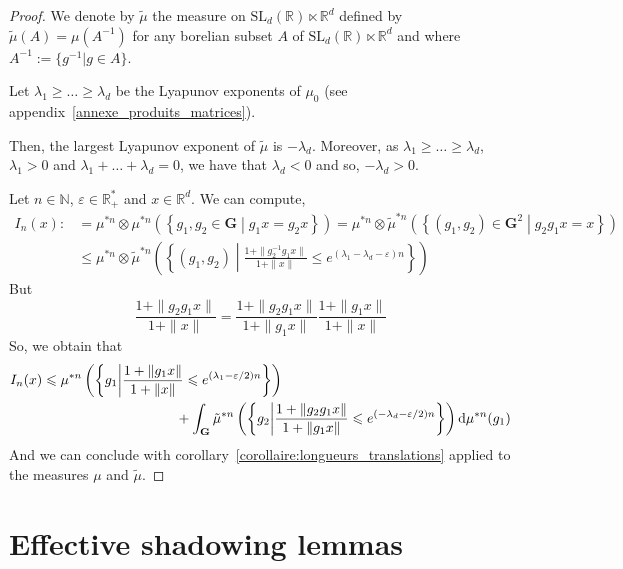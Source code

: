 \documentclass[11pt]{amsart}
\theoremstyle{definition}
\theoremstyle{remark}
\numberwithin{equation}{section}
\begin{document}
\begin{proof}
We denote by $\tilde \mu$ the measure on $\mathrm{SL}_d({\mathbb R})\ltimes {\mathbb R}^d$ defined by $\tilde\mu(A) = \mu(A^{-1})$ for any borelian subset $A$ of $\mathrm{SL}_d({\mathbb R})\ltimes {\mathbb R}^d$ and where $A^{-1} := \{g^{-1 } | g\in A\}$.

Let $\lambda_1 \geqslant \dots \geqslant \lambda_d$ be the Lyapunov exponents of $\mu_0$ (see appendix~\ref{annexe_produits_matrices}).

Then, the largest Lyapunov exponent of $\tilde \mu$ is $-\lambda_d$. Moreover, as $\lambda_1 \geqslant \dots \geqslant \lambda_d$, $\lambda_1>0$ and $\lambda_1 + \dots + \lambda_d = 0$, we have that $\lambda_d <0$ and so, $-\lambda_d>0$.

Let $n\in {\mathbb N}$, $\varepsilon\in {\mathbb R}_+^\ast$ and $x\in {\mathbb R}^d$. We can compute,
\begin{align*}
I_n(x):&=\mu^{\ast n} \otimes \mu^{\ast n} \left(\left\{g_1,g_2 \in {\mathbf G} \middle| g_1 x=g_2x \right\}\right) = \mu^{\ast n} \otimes \tilde\mu^{\ast n} \left(\left\{(g_1,g_2) \in {\mathbf G}^2 \middle| g_2g_1 x=x \right\}\right) \\
&\leqslant \mu^{\ast n} \otimes\tilde\mu^{\ast n} \left(\left\{(g_1,g_2)\middle| \frac{1+\|g_2^{-1} g_1x\|}{1+\|x\|} \leqslant e^{(\lambda_1 - \lambda_d- \varepsilon)n}\right\} \right) 
\end{align*}
But
\[
\frac{1+\|g_2 g_1x\|}{1+\|x\|} = \frac{1+\|g_2 g_1x\|}{1+\|g_1x\|}\frac{1+\|g_1x\|}{1+\|x\|}
\]
So, we obtain that
\begin{align*}
I_n(x) &\leqslant \mu^{\ast n}\left(\left\{ g_1\middle| \frac{1+\|g_1x\|}{1+\|x\|} \leqslant e^{(\lambda_1 - \varepsilon/2)n} \right\}\right) \\& {\hspace{1.7cm}}{\hspace{1.7cm}}+ \int_{\mathbf G} \tilde\mu^{\ast n}\left(\left\{ g_2\middle| \frac{1+\|g_2g_1x\|}{1+\|g_1x\|} \leqslant e^{(-\lambda_d - \varepsilon/2)n} \right\}\right) {{\rm d}}\mu^{\ast n}(g_1)
\end{align*}
And we can conclude with corollary~\ref{corollaire:longueurs_translations} applied to the measures $\mu$ and $\tilde\mu$.
\end{proof}

\section{Effective shadowing lemmas} \label{section:fermeture}
\end{document}
